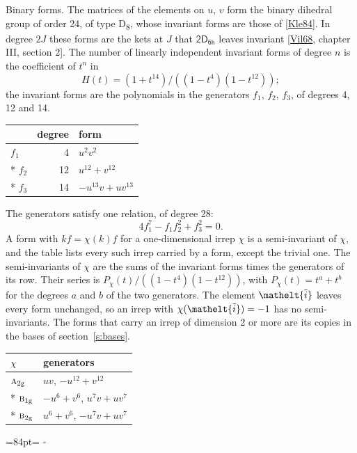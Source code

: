 \documentclass[10pt,a4paper]{article}
\makeatletter
\renewcommand\paragraph{\@startsection{paragraph}{4}{\z@}{1.5ex plus .5ex minus .2ex}{-1em}%
  {\normalfont\small\sffamily\bfseries\color{parttitle}}}
\newcommand{\needspace}[1]{\par\penalty-100\begingroup\dimen0=#1\relax\dimen2=\pagegoal
  \advance\dimen2-\pagetotal\ifdim\dimen0>\dimen2\relax\ifdim\dimen2>0pt\vfil\break\fi\fi
  \endgroup}
\numberwithin{equation}{section}
\newcommand{\eltfont}[1]{{\let\sigma\eltsigma\mathelt{#1}}}
\newcommand{\grp}[1]{\mathsf{#1}}
\newcommand{\irr}[1]{\text{\normalfont\scshape #1}}
\newcommand{\elt}[1]{\eltfont{#1}}
\newcommand{\ptag}[1]{\mathrm{#1}}
\newcommand{\lift}[1]{\tilde{#1}}
\makeatother
\begin{document}
\paragraph{Binary forms.}
The matrices of the elements on $u$, $v$ form the binary dihedral group of order 24, of type D\textsubscript{8}, whose invariant forms are those of [\href{../../../REFERENCES.pdf\#ref.Kle84}{Kle84}]. In degree $2J$ these forms are the kets at $J$ that $\grp{2D_{6h}}$ leaves invariant [\href{../../../REFERENCES.pdf\#ref.Vil68}{Vil68}, chapter III, section 2]. \label{n:head.degree}\label{n:head.form}The number of linearly independent invariant forms of degree $n$ is the coefficient of $t^n$ in
\begin{equation}\label{e:molien}H(t) = (1 + t^{14})/((1-t^{4})(1-t^{12}));\end{equation}
the invariant forms are the polynomials in the generators $f_1$, $f_2$, $f_3$, of degrees 4, 12 and 14.
{\small\begin{longtable}{@{}lrl@{}}\toprule
& degree & form\\\midrule\endhead
\bottomrule\endfoot\endlastfoot
$f_{1}$ & 4 & $u^{2}v^{2}$\\*
$f_{2}$ & 12 & $u^{12} + v^{12}$\\*
$f_{3}$ & 14 & $-u^{13}v + uv^{13}$\\
\bottomrule\end{longtable}}
The generators satisfy one relation, of degree 28:
\begin{equation}\label{e:relation}4f_{1}^{7} - f_{1}f_{2}^{2} + f_{3}^{2} = 0.\end{equation}
A form with $k f = \chi(k) f$ for a one-dimensional irrep $\chi$ is a semi-invariant of $\chi$, and the table lists every such irrep carried by a form, except the trivial one. \label{n:head.generators}The semi-invariants of $\chi$ are the sums of the invariant forms times the generators of its row. Their series is $P_\chi(t)/((1-t^{4})(1-t^{12}))$, with $P_\chi(t) = t^{a} + t^{b}$ for the degrees $a$ and $b$ of the two generators. The element $\elt{\lift{i}}$ leaves every form unchanged, so an irrep with $\chi(\elt{\lift{i}}) = -1$ has no semi-invariants. The forms that carry an irrep of dimension 2 or more are its copies in the bases of section~\ref{s:bases}.
{\small\begin{longtable}{@{}ll@{}}\toprule
$\chi$ & generators\\\midrule\endhead
\bottomrule\endfoot\endlastfoot
$\irr{a}_{2\ptag{g}}$ & $uv$, $-u^{12} + v^{12}$\\*
$\irr{b}_{1\ptag{g}}$ & $-u^{6} + v^{6}$, $u^{7}v + uv^{7}$\\*
$\irr{b}_{2\ptag{g}}$ & $u^{6} + v^{6}$, $-u^{7}v + uv^{7}$\\
\bottomrule\end{longtable}}
\needspace{84pt}
\end{document}
